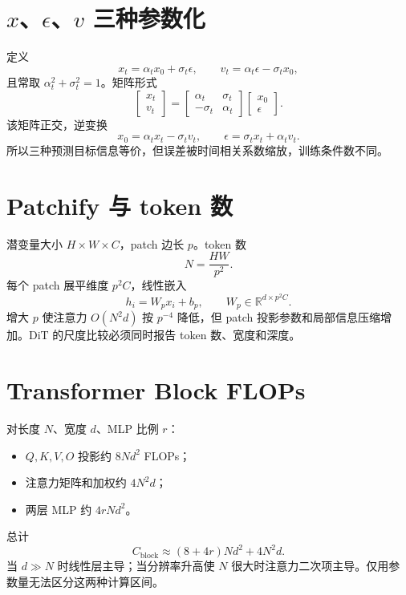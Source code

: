 \documentclass[UTF8,12pt,a4paper,fontset=none]{ctexart}
\numberwithin{equation}{section}
\newcommand{\R}{\mathbb{R}}
\begin{document}
\section{$x$、$\epsilon$、$v$ 三种参数化}
定义
\begin{equation}
 x_t=\alpha_tx_0+\sigma_t\epsilon,
 \qquad
 v_t=\alpha_t\epsilon-\sigma_tx_0,
\end{equation}
且常取 $\alpha_t^2+\sigma_t^2=1$。矩阵形式
\begin{equation}
 \begin{bmatrix}x_t\\v_t\end{bmatrix}
 =\begin{bmatrix}\alpha_t&\sigma_t\\-\sigma_t&\alpha_t\end{bmatrix}
 \begin{bmatrix}x_0\\\epsilon\end{bmatrix}.
\end{equation}
该矩阵正交，逆变换
\begin{equation}
 x_0=\alpha_tx_t-\sigma_tv_t,
 \qquad
 \epsilon=\sigma_tx_t+\alpha_tv_t.
\end{equation}
所以三种预测目标信息等价，但误差被时间相关系数缩放，训练条件数不同。

\section{Patchify 与 token 数}
潜变量大小 $H\times W\times C$，patch 边长 $p$。token 数
\begin{equation}
 N=\frac{HW}{p^2}.
\end{equation}
每个 patch 展平维度 $p^2C$，线性嵌入
\begin{equation}
 h_i=W_px_i+b_p,
 \qquad W_p\in\R^{d\times p^2C}.
\end{equation}
增大 $p$ 使注意力 $O(N^2d)$ 按 $p^{-4}$ 降低，但 patch 投影参数和局部信息压缩增加。DiT 的尺度比较必须同时报告 token 数、宽度和深度。

\section{Transformer Block FLOPs}
对长度 $N$、宽度 $d$、MLP 比例 $r$：
\begin{itemize}[leftmargin=2em]
\item $Q,K,V,O$ 投影约 $8Nd^2$ FLOPs；
\item 注意力矩阵和加权约 $4N^2d$；
\item 两层 MLP 约 $4rNd^2$。
\end{itemize}
总计
\begin{equation}
 C_{\mathrm{block}}\approx(8+4r)Nd^2+4N^2d.
\end{equation}
当 $d\gg N$ 时线性层主导；当分辨率升高使 $N$ 很大时注意力二次项主导。仅用参数量无法区分这两种计算区间。
\end{document}
